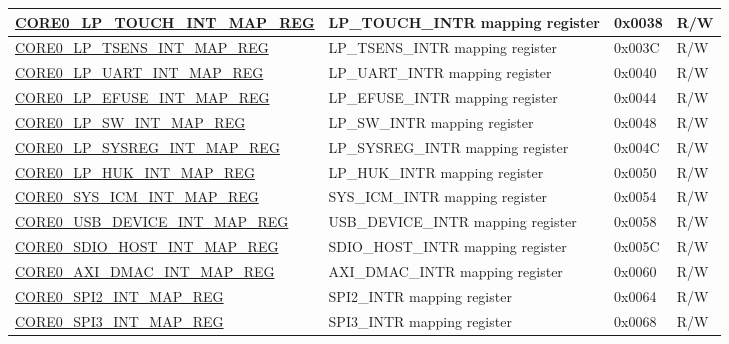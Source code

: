 \begin{longtable}{ | p{7.5cm} | p{7.2cm} | p{1.3cm} | p{1cm} | }
\hyperref[regdesc:CORE0LPTOUCHINTMAPREG]{CORE0\_LP\_TOUCH\_INT\_MAP\_REG} & LP\_TOUCH\_INTR mapping register & 0x0038 & R/W \\ \hline

\hyperref[regdesc:CORE0LPTSENSINTMAPREG]{CORE0\_LP\_TSENS\_INT\_MAP\_REG} & LP\_TSENS\_INTR mapping register & 0x003C & R/W \\ \hline

\hyperref[regdesc:CORE0LPUARTINTMAPREG]{CORE0\_LP\_UART\_INT\_MAP\_REG} & LP\_UART\_INTR mapping register & 0x0040 & R/W \\ \hline

\hyperref[regdesc:CORE0LPEFUSEINTMAPREG]{CORE0\_LP\_EFUSE\_INT\_MAP\_REG} & LP\_EFUSE\_INTR mapping register & 0x0044 & R/W \\ \hline

\hyperref[regdesc:CORE0LPSWINTMAPREG]{CORE0\_LP\_SW\_INT\_MAP\_REG} & LP\_SW\_INTR mapping register & 0x0048 & R/W \\ \hline

\hyperref[regdesc:CORE0LPSYSREGINTMAPREG]{CORE0\_LP\_SYSREG\_INT\_MAP\_REG} & LP\_SYSREG\_INTR mapping register & 0x004C & R/W \\ \hline

\hyperref[regdesc:CORE0LPHUKINTMAPREG]{CORE0\_LP\_HUK\_INT\_MAP\_REG} & LP\_HUK\_INTR mapping register & 0x0050 & R/W \\ \hline

\hyperref[regdesc:CORE0SYSICMINTMAPREG]{CORE0\_SYS\_ICM\_INT\_MAP\_REG} & SYS\_ICM\_INTR mapping register & 0x0054 & R/W \\ \hline

\hyperref[regdesc:CORE0USBDEVICEINTMAPREG]{CORE0\_USB\_DEVICE\_INT\_MAP\_REG} & USB\_DEVICE\_INTR mapping register & 0x0058 & R/W \\ \hline

\hyperref[regdesc:CORE0SDIOHOSTINTMAPREG]{CORE0\_SDIO\_HOST\_INT\_MAP\_REG} & SDIO\_HOST\_INTR mapping register & 0x005C & R/W \\ \hline

\hyperref[regdesc:CORE0AXIDMACINTMAPREG]{CORE0\_AXI\_DMAC\_INT\_MAP\_REG} & AXI\_DMAC\_INTR mapping register & 0x0060 & R/W \\ \hline

\hyperref[regdesc:CORE0SPI2INTMAPREG]{CORE0\_SPI2\_INT\_MAP\_REG} & SPI2\_INTR mapping register & 0x0064 & R/W \\ \hline

\hyperref[regdesc:CORE0SPI3INTMAPREG]{CORE0\_SPI3\_INT\_MAP\_REG} & SPI3\_INTR mapping register & 0x0068 & R/W \\ \hline


\end{longtable}
